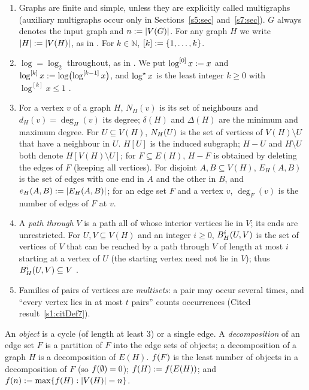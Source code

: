 \begin{convention}\label{s1:convGraphs}
\begin{enumerate}
\item[(a)] Graphs are finite and simple, unless they are explicitly called
multigraphs (auxiliary multigraphs occur only in Sections~\ref{s5:sec}
and~\ref{s7:sec}). $G$ always denotes the input graph and $n\mathrel{:=}|V(G)|$. For
any graph $H$ we write $|H|\mathrel{:=}|V(H)|$, as in \cite{BM}. For $k\in\mathbb N$,
$[k]\mathrel{:=}\{1,\dots,k\}$.
\item[(b)] $\log=\log_2$ throughout, as in \cite[l.~141]{BM}. We put
$\log^{[0]}x\mathrel{:=} x$ and $\log^{[k]}x\mathrel{:=}\log\bigl(\log^{[k-1]}x\bigr)$, and
$\log^{\star} x$ is the least integer $k\ge0$ with $\log^{[k]}x\le1$
\cite[l.~144--145]{BM}.
\item[(c)] For a vertex $v$ of a graph $H$, $N_H(v)$ is its set of neighbours
and $d_H(v)=\deg_H(v)$ its degree; $\delta(H)$ and $\Delta(H)$ are the minimum
and maximum degree. For $U\subseteq V(H)$, $N_H(U)$ is the set of vertices of
$V(H)\setminus U$ that have a neighbour in $U$. $H[U]$ is the induced subgraph;
$H-U$ and $H\setminus U$ both denote $H[V(H)\setminus U]$; for
$F\subseteq E(H)$, $H-F$ is obtained by deleting the edges of $F$ (keeping all
vertices). For disjoint $A,B\subseteq V(H)$, $E_H(A,B)$ is the set of edges with
one end in $A$ and the other in $B$, and $e_H(A,B)\mathrel{:=}|E_H(A,B)|$; for an
edge set $F$ and a vertex $v$, $\deg_F(v)$ is the number of edges of $F$ at $v$.
\item[(d)] A \emph{path through} $V$ is a path all of whose interior vertices lie
in $V$; its ends are unrestricted. For $U,V\subseteq V(H)$ and an integer
$i\ge0$, $B^{i}_{H}(U,V)$ is the set of vertices of $V$ that can be reached by
a path through $V$ of length at most $i$ starting at a vertex of $U$ (the
starting vertex need not lie in $V$); thus $B^{i}_{H}(U,V)\subseteq V$
\cite[l.~379--385]{BM}.
\item[(e)] Families of pairs of vertices are \emph{multisets}: a pair may occur
several times, and ``every vertex lies in at most $t$ pairs'' counts occurrences
(Cited result~\ref{s1:citDef7}).
\end{enumerate}
\end{convention}

\begin{definition}\label{s1:defObject}
An \emph{object} is a cycle (of length at least $3$) or a single edge. A
\emph{decomposition} of an edge set $F$ is a partition of $F$ into the edge sets
of objects; a decomposition of a graph $H$ is a decomposition of $E(H)$.
$f(F)$ is the least number of objects in a decomposition of $F$ (so
$f(\emptyset)=0$); $f(H)\mathrel{:=}f(E(H))$; and
$f(n)\mathrel{:=}\max\{f(H):|V(H)|=n\}$.
\end{definition}

